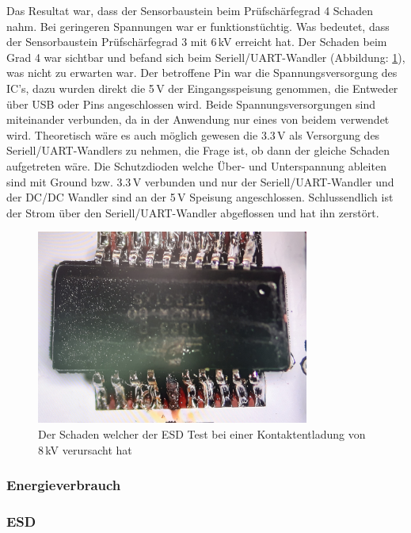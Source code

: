 Das Resultat war, dass der Sensorbaustein beim Prüfschärfegrad 4 Schaden nahm. Bei geringeren Spannungen war er funktionstüchtig. Was bedeutet, dass der Sensorbaustein Prüfschärfegrad 3 mit 6\,kV erreicht hat. Der Schaden beim Grad 4 war sichtbar und befand sich beim Seriell/UART-Wandler (Abbildung: \ref{pic: ESD_Schaden}), was nicht zu erwarten war. Der betroffene Pin war die Spannungsversorgung des IC's, dazu wurden direkt die 5\,V der Eingangsspeisung genommen, die Entweder über USB oder Pins angeschlossen wird. Beide Spannungsversorgungen sind miteinander verbunden, da in der Anwendung nur eines von beidem verwendet wird. Theoretisch wäre es auch möglich gewesen die 3.3\,V als Versorgung des Seriell/UART-Wandlers zu nehmen, die Frage ist, ob dann der gleiche Schaden aufgetreten wäre. Die Schutzdioden welche Über- und Unterspannung ableiten sind mit Ground bzw. 3.3\,V verbunden und nur der Seriell/UART-Wandler und der DC/DC Wandler sind an der 5\,V Speisung angeschlossen. Schlussendlich ist der Strom über den Seriell/UART-Wandler abgeflossen und hat ihn zerstört.

 \begin{figure}[H]
	\centering
	\includegraphics[width=0.8\textwidth]{graphics/ESD_Schaden.jpg}
	\caption{Der Schaden welcher der ESD Test bei einer Kontaktentladung von 8\,kV verursacht hat}
	\label{pic: ESD_Schaden}
\end{figure}

\subsubsection{Energieverbrauch}

\subsubsection{ESD}






